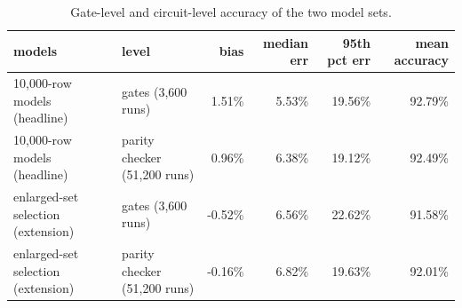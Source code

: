 \begin{table}[H]
\centering
{\small
\begin{tabular}{llrrrr}
\toprule
models & level & bias & median err & 95th pct err & mean accuracy \\
\midrule
10,000-row models (headline) & gates (3,600 runs) & 1.51\% & 5.53\% & 19.56\% & 92.79\% \\
10,000-row models (headline) & parity checker (51,200 runs) & 0.96\% & 6.38\% & 19.12\% & 92.49\% \\
enlarged-set selection (extension) & gates (3,600 runs) & -0.52\% & 6.56\% & 22.62\% & 91.58\% \\
enlarged-set selection (extension) & parity checker (51,200 runs) & -0.16\% & 6.82\% & 19.63\% & 92.01\% \\
\bottomrule
\end{tabular}
}
\caption{Gate-level and circuit-level accuracy of the two model sets.}
\label{tab:sets}
\end{table}

